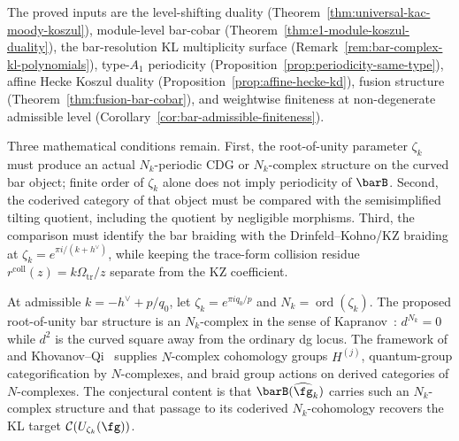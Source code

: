 \begin{remark}\label{rem:kl-evidence}
The proved inputs are the level-shifting duality
(Theorem~\ref{thm:universal-kac-moody-koszul}), module-level
bar-cobar (Theorem~\ref{thm:e1-module-koszul-duality}), the
bar-resolution KL multiplicity surface
(Remark~\ref{rem:bar-complex-kl-polynomials}), type-\(A_1\)
periodicity (Proposition~\ref{prop:periodicity-same-type}), affine
Hecke Koszul duality (Proposition~\ref{prop:affine-hecke-kd}), fusion
structure (Theorem~\ref{thm:fusion-bar-cobar}), and weightwise
finiteness at non-degenerate admissible level
(Corollary~\ref{cor:bar-admissible-finiteness}).

Three mathematical conditions remain.  First, the root-of-unity parameter
\(\zeta_k\) must produce an actual \(N_k\)-periodic CDG or
\(N_k\)-complex structure on the curved bar object; finite order of
\(\zeta_k\) alone does not imply periodicity of \(\barB\).  Second,
the coderived category of that object must be compared with the
semisimplified tilting quotient, including the quotient by negligible
morphisms.  Third, the comparison must identify the bar braiding with
the Drinfeld--Kohno/KZ braiding at
\(\zeta_k=e^{\pi i/(k+h^\vee)}\), while keeping the trace-form
collision residue \(r^{\mathrm{coll}}(z)=k\Omega_{\mathrm{tr}}/z\)
separate from the KZ coefficient.
\end{remark}

\begin{remark}\label{rem:n-complex-framework}
At admissible $k=-h^\vee+p/q_0$, let
\(\zeta_k=e^{\pi i q_0/p}\) and
\(N_k=\operatorname{ord}(\zeta_k)\).  The proposed root-of-unity
bar structure is an \(N_k\)-complex in the sense of
Kapranov~\cite{Kapranov96}: \(d^{N_k}=0\) while \(d^2\) is the
curved square away from the ordinary dg locus.  The framework of
\cite{Kapranov96} and Khovanov--Qi~\cite{KQ20} supplies
\(N\)-complex cohomology groups \(H^{(j)}\), quantum-group
categorification by \(N\)-complexes, and braid group actions on
derived categories of \(N\)-complexes.  The conjectural content is
that \(\barB(\widehat{\fg}_k)\) carries such an \(N_k\)-complex
structure and that passage to its coderived \(N_k\)-cohomology
recovers the KL target \(\mathcal C(U_{\zeta_k}(\fg))\).
\end{remark}

